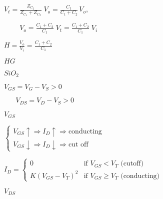 \documentclass{article}
\def\lthtmlcheckvsize{\ifdim\ht\sizebox<\vsize 
  \ifdim\wd\sizebox<\hsize\expandafter\hfill\fi \expandafter\vfill
  \else\expandafter\vss\fi}%
\begin{document}
{\newpage\clearpage
{}%
$\displaystyle V_t=\frac{Z_{C_2}}{Z_{C_1}+Z_{C_2}}\;V_o=\frac{C_1}{C_1+C_2}\,V_o,
\;\;\;\;\;$%
\lthtmlindisplaymathZ
\lthtmlcheckvsize\clearpage}

{\newpage\clearpage
{}%
$\displaystyle \;\;\;\;\;\;\;\;
V_o=\frac{C_1+C_2}{C_1}\;V_t=\frac{C_1+C_2}{C_1}\;V_i$%
\lthtmlindisplaymathZ
\lthtmlcheckvsize\clearpage}

{\newpage\clearpage
{}%
$\displaystyle H=\frac{V_o}{V_i}=\frac{C_1+C_2}{C_1}$%
\lthtmlindisplaymathZ
\lthtmlcheckvsize\clearpage}

{\newpage\clearpage
{}%
$ HG$%
\lthtmlindisplaymathZ
\lthtmlcheckvsize\clearpage}

{\newpage\clearpage
{}%
$ SiO_2$%
\lthtmlindisplaymathZ
\lthtmlcheckvsize\clearpage}

{\newpage\clearpage
{}%
$\displaystyle V_{GS}=V_G-V_S>0 \;\;\;\;\;\;\;$%
\lthtmlindisplaymathZ
\lthtmlcheckvsize\clearpage}

{\newpage\clearpage
{}%
$\displaystyle \;\;\;\;\;\;V_{DS}=V_D-V_S>0$%
\lthtmlindisplaymathZ
\lthtmlcheckvsize\clearpage}

{\newpage\clearpage
{}%
$ V_{GS}$%
\lthtmlindisplaymathZ
\lthtmlcheckvsize\clearpage}

{\newpage\clearpage
{}%
$\displaystyle \left\{ \begin{array}{l}
V_{GS} \uparrow \Longrightarrow I_D \uparrow \Longrightarrow \mbox{conducting} \\
V_{GS} \downarrow \Longrightarrow I_D \downarrow \Longrightarrow \mbox{cut off}
\end{array} \right.$%
\lthtmlindisplaymathZ
\lthtmlcheckvsize\clearpage}

{\newpage\clearpage
{}%
$\displaystyle I_D=\left\{ \begin{array}{ll}
0 & \mbox{if $V_{GS}<V_T$\  (cutoff)} \\
K(V_{GS}-V_T)^2 & \mbox{if $V_{GS}\ge V_T$\  (conducting)}
\end{array} \right.$%
\lthtmlindisplaymathZ
\lthtmlcheckvsize\clearpage}

{\newpage\clearpage
{}%
$ V_{DS}$%
\lthtmlindisplaymathZ
\lthtmlcheckvsize\clearpage}
\end{document}

